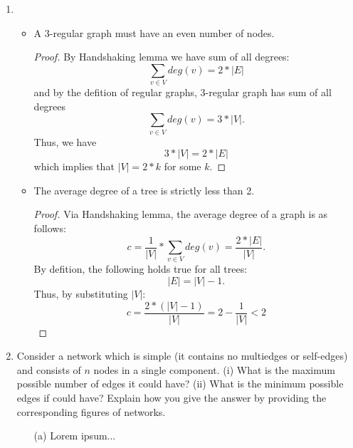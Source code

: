 \documentclass[12pt,a4paper,oneside,draft]{article}
\begin{document}
\begin{enumerate}
\begin{itemize}
    \end{itemize}
  \item
    \begin{itemize}
      \item
        A 3-regular graph must have an even number of nodes.
        \begin{proof}
          By Handshaking lemma we have sum of all degrees: $$\sum_{v \in V} deg(v) = 2 * |E|$$
          and by the defition of regular graphs, 3-regular graph has sum of all degrees
          $$\sum_{v \in V} deg(v) = 3 * |V|.$$
          Thus, we have $$3 * |V| = 2 * |E|$$ which implies that $|V| = 2 * k$ for some $k$.
        \end{proof}
      \item
        The average degree of a tree is strictly less than 2.
        \begin{proof}
          Via Handshaking lemma, the average degree of a graph is as follows:
            $$c = \frac{1}{|V|} * \sum_{v \in V} deg(v) = \frac{2 * |E|}{|V|}.$$
          By defition, the following holds true for all trees: $$|E| = |V| - 1.$$
          Thus, by substituting $|V|$:
            $$c = \frac{2 * (|V| - 1)}{|V|} = 2 - \frac{1}{|V|} < 2$$
        \end{proof}
    \end{itemize}
  \item
    Consider a network which is simple (it contains no multiedges or self-edges)
    and consists of $n$ nodes in a single component.
    \newline
    (i) What is the maximum possible number of edges it could have?
    \newline
    (ii) What is the minimum possible edges if could have?
    \newline
    Explain how you give the answer by providing the corresponding figures of networks.
    \begin{itemize}
      \item [(a) ]
        Lorem ipsum...      
    \end{itemize}
\end{enumerate}
\end{document}
